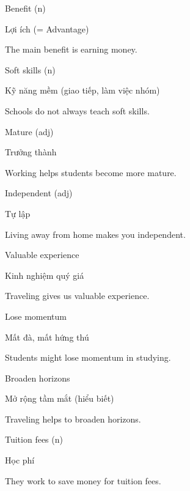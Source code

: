 \documentclass{../templateWriting/cdwriting}
\begin{document}
Benefit (n)

Lợi ích (= Advantage)

The main benefit is earning money.

Soft skills (n)

Kỹ năng mềm (giao tiếp, làm việc nhóm)

Schools do not always teach soft skills.

Mature (adj)

Trưởng thành

Working helps students become more mature.

Independent (adj)

Tự lập

Living away from home makes you independent.

Valuable experience

Kinh nghiệm quý giá

Traveling gives us valuable experience.

Lose momentum

Mất đà, mất hứng thú

Students might lose momentum in studying.

Broaden horizons

Mở rộng tầm mắt (hiểu biết)

Traveling helps to broaden horizons.

Tuition fees (n)

Học phí

They work to save money for tuition fees.
\end{document}
